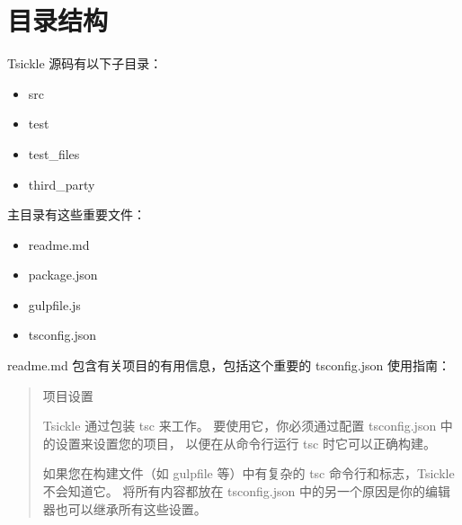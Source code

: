 \section{目录结构}


Tsickle 源码有以下子目录：

\begin{itemize}
  \item src
  \item test
  \item test\_files
  \item third\_party
\end{itemize}


主目录有这些重要文件：

\begin{itemize}
  \item readme.md
  \item package.json
  \item gulpfile.js
  \item tsconfig.json
\end{itemize}


%


readme.md 包含有关项目的有用信息，包括这个重要的
tsconfig.json 使用指南：

\begin{quote}
  项目设置

  Tsickle 通过包装 tsc 来工作。
  要使用它，你必须通过配置 tsconfig.json 中的设置来设置您的项目，
  以便在从命令行运行 tsc 时它可以正确构建。

  如果您在构建文件（如 gulpfile 等）中有复杂的 tsc 命令行和标志，Tsickle 不会知道它。
  将所有内容都放在 tsconfig.json 中的另一个原因是你的编辑器也可以继承所有这些设置。
\end{quote}


